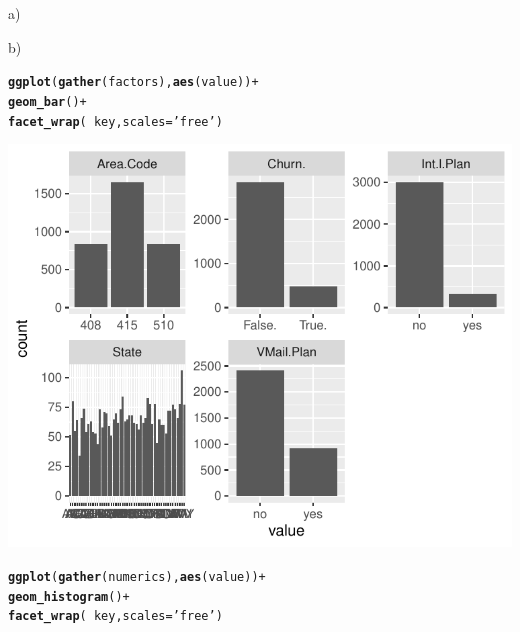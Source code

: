 \documentclass{article}\usepackage[]{graphicx}\usepackage[]{color}
\makeatletter
\def\maxwidth{ %
  \ifdim\Gin@nat@width>\linewidth
    \linewidth
  \else
    \Gin@nat@width
  \fi
}
\newcommand{\hlstr}[1]{\textcolor[rgb]{0.192,0.494,0.8}{#1}}%
\newcommand{\hlopt}[1]{\textcolor[rgb]{0,0,0}{#1}}%
\newcommand{\hlstd}[1]{\textcolor[rgb]{0.345,0.345,0.345}{#1}}%
\newcommand{\hlkwc}[1]{\textcolor[rgb]{0.333,0.667,0.333}{#1}}%
\newcommand{\hlkwd}[1]{\textcolor[rgb]{0.737,0.353,0.396}{\textbf{#1}}}%
\newenvironment{kframe}{%
 \def\at@end@of@kframe{}%
 \ifinner\ifhmode%
  \def\at@end@of@kframe{\end{minipage}}%
  \begin{minipage}{\columnwidth}%
 \fi\fi%
 \def\FrameCommand##1{\hskip\@totalleftmargin \hskip-\fboxsep
 \colorbox{shadecolor}{##1}\hskip-\fboxsep
     \hskip-\linewidth \hskip-\@totalleftmargin \hskip\columnwidth}%
 \MakeFramed {\advance\hsize-\width
   \@totalleftmargin\z@ \linewidth\hsize
   \@setminipage}}%
 {\par\unskip\endMakeFramed%
 \at@end@of@kframe}
\newenvironment{knitrout}{}{} %
\makeatother
\begin{document}
\begin{description}


\item{a)}



\item{b)}

\begin{knitrout}
\color{fgcolor}\begin{kframe}
\begin{alltt}
\hlkwd{ggplot}\hlstd{(}\hlkwd{gather}\hlstd{(factors),} \hlkwd{aes}\hlstd{(value))} \hlopt{+}
  \hlkwd{geom_bar}\hlstd{()} \hlopt{+}
  \hlkwd{facet_wrap}\hlstd{(}\hlopt{~}\hlstd{key,} \hlkwc{scales}\hlstd{=}\hlstr{'free'}\hlstd{)}
\end{alltt}


{\ttfamily\noindent\color{warningcolor}{\#\# Warning: attributes are not identical across measure variables;\\\#\# they will be dropped}}\end{kframe}

{\centering \includegraphics[width=\maxwidth]{figure/Overviews_plots-1} 

}


\begin{kframe}\begin{alltt}
\hlkwd{ggplot}\hlstd{(}\hlkwd{gather}\hlstd{(numerics),} \hlkwd{aes}\hlstd{(value))} \hlopt{+}
  \hlkwd{geom_histogram}\hlstd{()} \hlopt{+}
  \hlkwd{facet_wrap}\hlstd{(}\hlopt{~}\hlstd{key,} \hlkwc{scales}\hlstd{=}\hlstr{'free'}\hlstd{)}
\end{alltt}



\end{kframe}
\end{knitrout}
\end{description}
\end{document}
